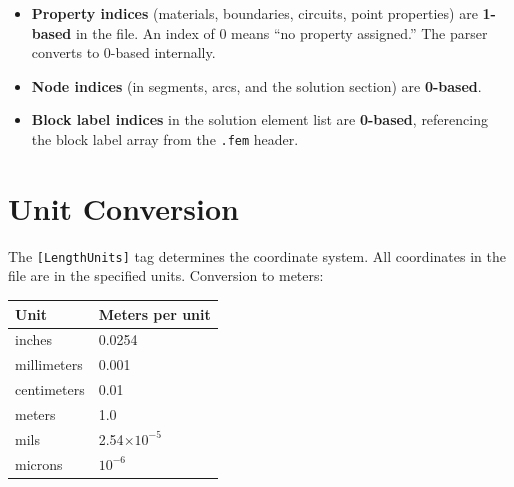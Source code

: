 \documentclass[11pt]{article}
\begin{document}
\begin{itemize}
  \item \textbf{Property indices} (materials, boundaries, circuits, point
        properties) are \textbf{1-based} in the file.  An index of 0
        means ``no property assigned.''  The parser converts to 0-based
        internally.

  \item \textbf{Node indices} (in segments, arcs, and the solution
        section) are \textbf{0-based}.

  \item \textbf{Block label indices} in the solution element list are
        \textbf{0-based}, referencing the block label array from the
        \texttt{.fem} header.
\end{itemize}

\section{Unit Conversion}

The \verb|[LengthUnits]| tag determines the coordinate system.  All
coordinates in the file are in the specified units.  Conversion to
meters:

\begin{center}
\begin{tabular}{ll}
\toprule
Unit & Meters per unit \\
\midrule
inches      & 0.0254 \\
millimeters & 0.001 \\
centimeters & 0.01 \\
meters      & 1.0 \\
mils        & 2.54$\times 10^{-5}$ \\
microns     & $10^{-6}$ \\
\bottomrule
\end{tabular}
\end{center}
\end{document}
